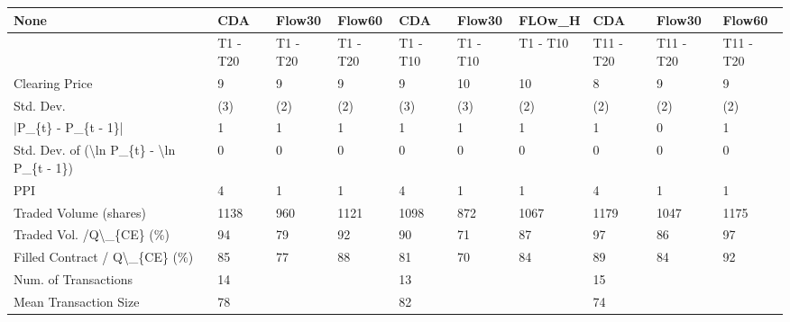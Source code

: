\begin{tabular}{llllllllll}
\hline
 None                                                      & CDA      & Flow30   & Flow60   & CDA      & Flow30   & FLOw\_H   & CDA       & Flow30    & Flow60    \\
\hline
                                                           & T1 - T20 & T1 - T20 & T1 - T20 & T1 - T10 & T1 - T10 & T1 - T10 & T11 - T20 & T11 - T20 & T11 - T20 \\
 Clearing Price                                            & 9        & 9        & 9        & 9        & 10       & 10       & 8         & 9         & 9         \\
 Std. Dev.                                                 & (3)      & (2)      & (2)      & (3)      & (3)      & (2)      & (2)       & (2)       & (2)       \\
 |P\_\{t\} - P\_\{t - 1\}|                                       & 1        & 1        & 1        & 1        & 1        & 1        & 1         & 0         & 1         \\
 Std. Dev. of (\textbackslash{}ln P\_\{t\} - \textbackslash{}ln P\_\{t - 1\})                  & 0        & 0        & 0        & 0        & 0        & 0        & 0         & 0         & 0         \\
 PPI                                                       & 4        & 1        & 1        & 4        & 1        & 1        & 4         & 1         & 1         \\
 Traded Volume (shares)                                    & 1138     & 960      & 1121     & 1098     & 872      & 1067     & 1179      & 1047      & 1175      \\
 Traded Vol. /Q\textbackslash{}\_\{CE\} (\%)                                  & 94       & 79       & 92       & 90       & 71       & 87       & 97        & 86        & 97        \\
 Filled Contract / Q\textbackslash{}\_\{CE\} (\%)                             & 85       & 77       & 88       & 81       & 70       & 84       & 89        & 84        & 92        \\
 Num. of Transactions                                      & 14       &          &          & 13       &          &          & 15        &           &           \\
 Mean Transaction Size                                     & 78       &          &          & 82       &          &          & 74        &           &           \\

\end{tabular}
